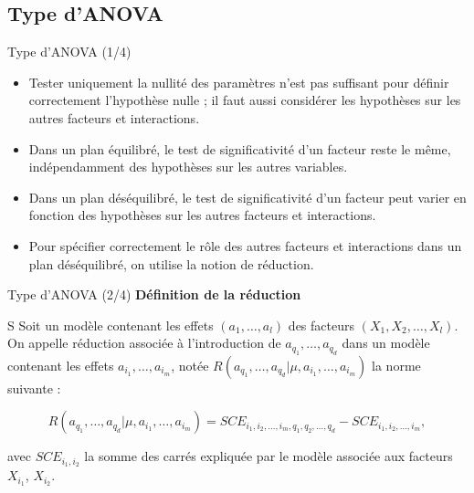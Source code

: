 \documentclass{beamer}
\begin{document}
	\subsection{Type d'ANOVA}
	\begin{frame}{Type d'ANOVA (1/4)}
		\begin{itemize}
			\item Tester uniquement la nullité des paramètres n'est pas suffisant pour définir correctement l'hypothèse nulle ; il faut aussi considérer les hypothèses sur les autres facteurs et interactions.
			\vfill
			\pause
			\item Dans un plan équilibré, le test de significativité d'un facteur reste le même, indépendamment des hypothèses sur les autres variables.
			\vfill
			\pause
			\item Dans un plan déséquilibré, le test de significativité d'un facteur peut varier en fonction des hypothèses sur les autres facteurs et interactions.
			\vfill
			\pause
			\item Pour spécifier correctement le rôle des autres facteurs et interactions dans un plan déséquilibré, on utilise la notion de réduction.
		\end{itemize}
	\end{frame}
	
	\begin{frame}{Type d'ANOVA (2/4)}
		\textbf{Définition de la réduction}
		\begin{myblock}
			S Soit un modèle contenant les effets $(a_1,\ldots,a_l)$ des facteurs $(X_1, X_2, \ldots, X_l)$. On appelle réduction associée à l'introduction de $a_{q_1}, \ldots, a_{q_d}$ dans un modèle contenant les effets $a_{i_1}, \ldots, a_{i_m}$, notée $R(a_{q_1}, \ldots, a_{q_d}|\mu,a_{i_1}, \ldots, a_{i_m})$ la norme suivante :
			
			\begin{equation}
				R(a_{q_1}, \ldots, a_{q_d}|\mu,a_{i_1}, \ldots, a_{i_m}) = SCE_{i_1,i_2,\ldots,i_m,q_1,q_2,\ldots,q_d} - SCE_{i_1,i_2,\ldots,i_m},
			\end{equation}
			
			avec $SCE_{i_1,i_2}$ la somme des carrés expliquée par le modèle associée aux facteurs $X_{i_1}$, $X_{i_2}$.
		\end{myblock}
	\end{frame}
	
\end{document}
